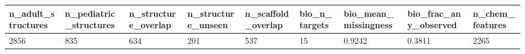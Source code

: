 \begin{tabular}{lllllllll}
\hline
n\_adult\_structures & n\_pediatric\_structures & n\_structure\_overlap & n\_structure\_unseen & n\_scaffold\_overlap & bio\_n\_targets & bio\_mean\_missingness & bio\_frac\_any\_observed & n\_chem\_features \\
\hline
2856 & 835 & 634 & 201 & 537 & 15 & 0.9242 & 0.3811 & 2265 \\
\hline
\end{tabular}
